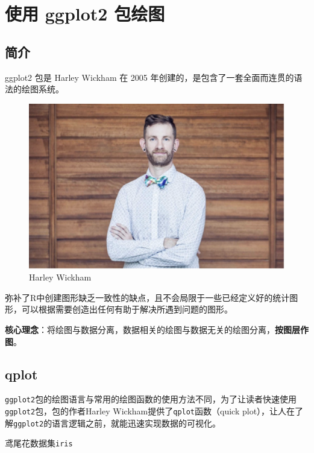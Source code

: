 \documentclass[
]{book}
\begin{document}
\hypertarget{ggplot2-plot}{%
\chapter{使用 ggplot2 包绘图}\label{ggplot2-plot}}

\hypertarget{ux7b80ux4ecb-1}{%
\section{简介}\label{ux7b80ux4ecb-1}}

ggplot2 包是 Harley
Wickham 在 2005 年创建的，是包含了一套全面而连贯的语法的绘图系统。

\begin{figure}
\centering
\includegraphics{figure/15.png}
\caption{Harley Wickham}
\end{figure}

弥补了R中创建图形缺乏一致性的缺点，且不会局限于一些已经定义好的统计图形，可以根据需要创造出任何有助于解决所遇到问题的图形。

\textbf{核心理念}：将绘图与数据分离，数据相关的绘图与数据无关的绘图分离，\textbf{按图层作图}。

\hypertarget{qplot}{%
\section{qplot}\label{qplot}}

\texttt{ggplot2}包的绘图语言与常用的绘图函数的使用方法不同，为了让读者快速使用\texttt{ggplot2}包，包的作者Harley
Wickham提供了\texttt{qplot}函数（quick
plot），让人在了解\texttt{ggplot2}的语言逻辑之前，就能迅速实现数据的可视化。

鸢尾花数据集\texttt{iris}
\end{document}

